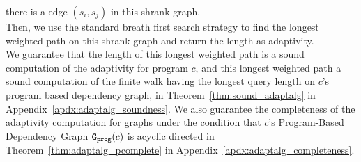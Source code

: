     there is a edge $(s_i, s_j)$ in this shrank graph. \\ 
    Then, we use the standard breath first search strategy to find the longest weighted path
    on this shrank graph and return the length as adaptivity.
    \\
    We guarantee that 
    the length of this longest weighted path is a sound computation of the adaptivity for program $c$,
    and this longest weighted path a sound computation of the finite walk having the longest query length 
    on $c$'s program based dependency graph, in Theorem~\ref{thm:sound_adaptalg}
    in Appendix~\ref{apdx:adaptalg_soundness}.
%    
We also guarantee the completeness of the adaptivity computation for graphs under the condition that 
$c$'s Program-Based Dependency Graph $\mathtt{{G_{prog}}}(c)$ is acyclic directed in Theorem~\ref{thm:adaptalg_pcomplete} 
in Appendix~\ref{apdx:adaptalg_completeness}.
